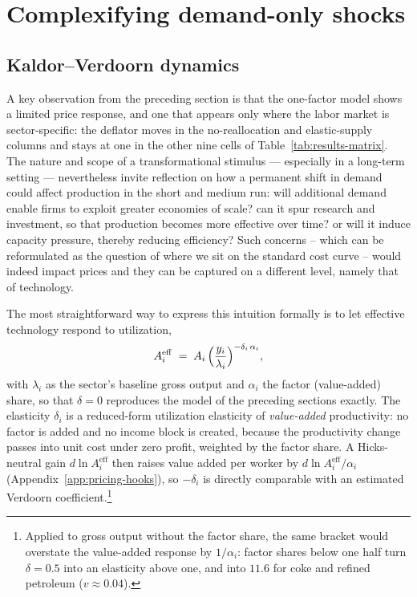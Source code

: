 \section{Complexifying demand-only shocks}\label{sec:beyond-demand-only}

\subsection{Kaldor--Verdoorn dynamics}\label{subsec:pricing-capacity}

A key observation from the preceding section is that the one-factor model shows a limited price response, and one that appears only where the labor market is sector-specific: the deflator moves in the no-reallocation and elastic-supply columns and stays at one in the other nine cells of Table~\ref{tab:results-matrix}. The nature and scope of a transformational stimulus --- especially in a long-term setting --- nevertheless invite reflection on how a permanent shift in demand could affect production in the short and medium run: will additional demand enable firms to exploit greater economies of scale? can it spur research and investment, so that production becomes more effective over time? or will it induce capacity pressure, thereby reducing efficiency? Such concerns -- which can be reformulated as the question of where we sit on the standard cost curve -- would indeed impact prices and they can be captured on a different level, namely that of technology.

The most straightforward way to express this intuition formally is to let
effective technology respond to utilization,
\begin{equation}\label{eq:capacity-door}
  A^{\mathrm{eff}}_i \;=\; A_i\,\Bigl(\frac{y_i}{\lambda_i}\Bigr)^{-\delta_i\,\alpha_i},
\end{equation}
with $\lambda_i$ as the sector's baseline gross output and $\alpha_i$ the factor (value-added) share, so that $\delta = 0$ reproduces the model of the preceding sections exactly.
The elasticity $\delta_i$ is a reduced-form utilization elasticity of \emph{value-added} productivity: no factor is added and no income block is created, because the productivity change passes into unit cost under zero profit, weighted by the factor share. A Hicks-neutral gain $d\ln A^{\mathrm{eff}}_i$ then raises value added per worker by $d\ln A^{\mathrm{eff}}_i/\alpha_i$ (Appendix~\ref{app:pricing-hooks}), so $-\delta_i$ is directly comparable with an estimated Verdoorn coefficient.\footnote{Applied to gross output without the factor share, the same bracket would overstate the value-added response by $1/\alpha_i$: factor shares below one half turn $\delta = 0.5$ into an elasticity above one, and into $11.6$ for coke and refined petroleum ($v \approx 0.04$).}

